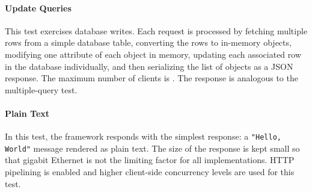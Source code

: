 
\paragraph{Update Queries}
This test exercises database writes.
Each request is processed by fetching multiple rows from a simple database table, converting the rows to in-memory objects, modifying one attribute of each object in memory, updating each associated row in the database individually, and then serializing the list of objects as a JSON response.
The maximum number of clients is .
The response is analogous to the multiple-query test.

\paragraph{Plain Text}
In this test, the framework responds with the simplest response: a \texttt{"Hello, World"} message rendered as plain text.
The size of the response is kept small so that gigabit Ethernet is not the limiting factor for all implementations.
HTTP pipelining is enabled and higher client-side concurrency levels are used for this test.

